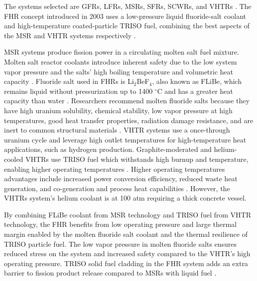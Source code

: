 The systems selected are \glspl{GFR}, \glspl{LFR}, \glspl{MSR}, \glspl{SFR}, \glspl{SCWR}, 
and \glspl{VHTR} \cite{gen_iv_international_forum_technology_2014}. 
The \acrfull{FHR} concept introduced in 2003 uses a low-pressure liquid fluoride-salt 
coolant and high-temperature coated-particle \gls{TRISO} fuel, combining 
the best aspects of the \gls{MSR} and \gls{VHTR} systems respectively
\cite{forsberg_molten-salt-cooled_2003,facilitators_fluoride-salt-cooled_2013}.

\gls{MSR} systems produce fission power in a circulating molten salt fuel 
mixture. 
Molten salt reactor coolants introduce inherent safety due to the 
low system vapor pressure and the salts' high boiling temperature and 
volumetric heat capacity \cite{ho_molten_2013}.
Fluoride salt used in \glspl{FHR} is Li$_2$BeF$_4$, also known as \gls{FLiBe}, 
which remains liquid without pressurization up to 1400 $^{\circ}$C and has a greater 
heat capacity than water \cite{ho_molten_2013,forsberg_fluoride-salt-cooled_2012}.
Researchers recommend molten fluoride salts because they have high uranium 
solubility, chemical stability, low vapor pressure at high temperatures, 
good heat transfer properties, radiation damage resistance, and are inert 
to common structural materials \cite{rosenthal_molten-salt_1970}. 
\gls{VHTR} systems use a once-through uranium cycle and leverage 
high outlet temperatures for high-temperature heat applications, such as 
hydrogen production. 
Graphite-moderated and helium-cooled \glspl{VHTR} use \gls{TRISO} fuel
which withstands high burnup and temperature, enabling higher operating 
temperatures \cite{gen_iv_international_forum_technology_2014}.  
Higher operating temperatures advantages include increased power 
conversion efficiency, reduced waste heat generation, and co-generation and 
process heat capabilities \cite{scarlat_design_2014}.
However, the \glspl{VHTR} system's helium coolant is at 100 atm requiring a 
thick concrete vessel. 

By combining \gls{FLiBe} coolant from \gls{MSR} technology and 
\gls{TRISO} fuel from \gls{VHTR} technology, the \gls{FHR} benefits from 
low operating pressure and large thermal margin enabled by the molten fluoride
salt coolant and the thermal resilience of \gls{TRISO} particle fuel. 
The low vapor pressure in molten fluoride salts ensures reduced stress on the system
and increased safety compared to the \gls{VHTR}'s high operating pressure. 
\gls{TRISO} solid fuel cladding in the \gls{FHR} system adds an extra barrier 
to fission product release compared to \glspl{MSR} with liquid fuel 
\cite{ho_molten_2013}.


